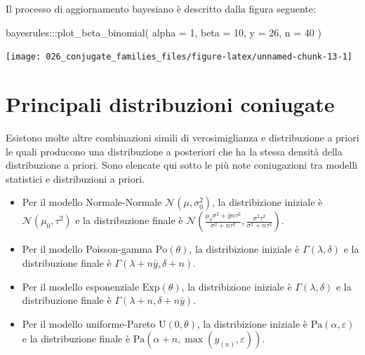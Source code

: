 \documentclass[
  10pt,
  italian,
  a4paper,
  extrafontsizes,onecolumn,openright
  ]{memoir}
\newenvironment{Shaded}{\begin{snugshade}}{\end{snugshade}}
\newcommand{\AttributeTok}[1]{\textcolor[rgb]{0.77,0.63,0.00}{#1}}
\newcommand{\DecValTok}[1]{\textcolor[rgb]{0.00,0.00,0.81}{#1}}
\newcommand{\FunctionTok}[1]{\textcolor[rgb]{0.00,0.00,0.00}{#1}}
\newcommand{\NormalTok}[1]{#1}
\newcommand{\SpecialCharTok}[1]{\textcolor[rgb]{0.00,0.00,0.00}{#1}}
\theoremstyle{definition}
\theoremstyle{definition}
\theoremstyle{definition}
\theoremstyle{definition}
\theoremstyle{remark}
\begin{document}
\noindent
Il processo di aggiornamento bayesiano è descritto dalla figura seguente:

\begin{Shaded}
\begin{Highlighting}[]
\NormalTok{bayesrules}\SpecialCharTok{:::}\FunctionTok{plot\_beta\_binomial}\NormalTok{(}
  \AttributeTok{alpha =} \DecValTok{1}\NormalTok{, }\AttributeTok{beta =} \DecValTok{10}\NormalTok{, }\AttributeTok{y =} \DecValTok{26}\NormalTok{, }\AttributeTok{n =} \DecValTok{40}
\NormalTok{)}
\end{Highlighting}
\end{Shaded}

\begin{center}\texttt{[image: 026\_conjugate\_families\_files/figure-latex/unnamed-chunk-13-1]} \end{center}

\hypertarget{principali-distribuzioni-coniugate}{%
\section{Principali distribuzioni coniugate}\label{principali-distribuzioni-coniugate}}

Esistono molte altre combinazioni simili di verosimiglianza e distribuzione a priori le quali producono una distribuzione a posteriori che ha la stessa densità della distribuzione a priori. Sono elencate qui sotto le più note coniugazioni tra modelli statistici e distribuzioni a priori.

\begin{itemize}
\item
  Per il modello Normale-Normale \(\mathcal{N}(\mu, \sigma^2_0)\), la distribizione iniziale è \(\mathcal{N}(\mu_0, \tau^2)\) e la distribuzione finale è \(\mathcal{N}\left(\frac{\mu_0\sigma^2 + \bar{y}n\tau^2}{\sigma^2 + n\tau^2}, \frac{\sigma^2\tau^2}{\sigma^2 + n\tau^2} \right)\).
\item
  Per il modello Poisson-gamma \(\text{Po}(\theta)\), la distribizione iniziale è \(\Gamma(\lambda, \delta)\) e la distribuzione finale è \(\Gamma(\lambda + n \bar{y}, \delta +n)\).
\item
  Per il modello esponenziale \(\text{Exp}(\theta)\), la distribizione iniziale è \(\Gamma(\lambda, \delta)\) e la distribuzione finale è \(\Gamma(\lambda + n, \delta +n\bar{y})\).
\item
  Per il modello uniforme-Pareto \(\text{U}(0, \theta)\), la distribizione iniziale è \(\mbox{Pa}(\alpha, \varepsilon)\) e la distribuzione finale è \(\mbox{Pa}(\alpha + n, \max(y_{(n)}, \varepsilon))\).
\end{itemize}
\end{document}
